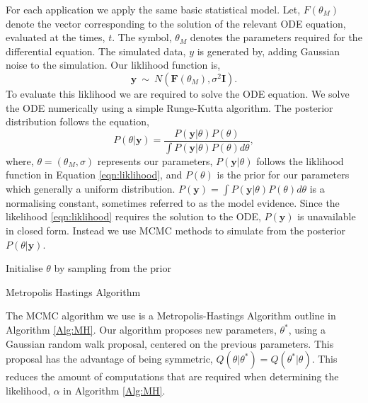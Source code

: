 For each application we apply the same basic statistical model. Let, $F(\theta_M)$ denote the vector corresponding to the solution of the relevant ODE equation, evaluated at the times, $t$. The symbol, $\theta_M$ denotes
the parameters required for the differential equation. The simulated data, $y$ is generated by, adding Gaussian noise to the simulation. Our liklihood function is, 
\begin{equation}
\textbf{y}~ \sim ~N\left(\textbf{F}\left(\theta_{M}\right),\sigma^2\textbf{I}\right). \label{eqn:liklihood}
\end{equation}
To evaluate this liklihood we are required to solve the ODE equation. We solve the ODE numerically using a simple Runge-Kutta algorithm. The posterior distribution follows the equation,
\begin{equation}
P(\theta|\textbf{y})=\frac{P(\textbf{y}|\theta)P(\theta)}{\int P(\textbf{y}|\theta)P(\theta) d\theta},
\end{equation}
where, $\theta=\left(\theta_M,\sigma\right)$ represents our parameters, $P(\textbf{y}|\theta)$ follows the liklihood function in Equation \ref{eqn:liklihood}, and $P(\theta)$ is the prior for our parameters which generally a uniform distribution. $P(\textbf{y})=\int P(\textbf{y}|\theta)P(\theta) d\theta$ is a normalising constant, sometimes referred to as the model evidence. Since the likelihood \ref{eqn:liklihood} requires the solution to the ODE, $P(\textbf{y})$ is unavailable in closed form. Instead we use MCMC methods to simulate from the posterior $P\left(\theta|\textbf{y}\right)$.\\
\begin{algorithm}[H]
\SetAlgoLined
{}
 Initialise $\theta$ by sampling from the prior\;
 \caption{Metropolis Hastings Algorithm}
 \label{Alg:MH}
\end{algorithm}
The MCMC algorithm we use is a Metropolis-Hastings Algorithm outline in Algorithm \ref{Alg:MH}. Our algorithm proposes new parameters, $\theta ^*$, using a Gaussian random walk proposal, centered on the previous parameters. This proposal has the advantage of being symmetric, $Q(\theta |\theta^*)=Q(\theta^*|\theta)$. This reduces the amount of computations that are required when determining the likelihood, $\alpha$ in Algorithm \ref{Alg:MH}.\\ 
